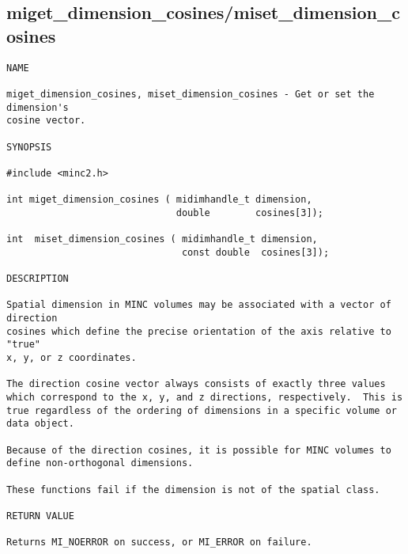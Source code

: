 \documentclass{article}
\begin{document}
\subsection{miget\_dimension\_cosines/miset\_dimension\_cosines}
\begin{verbatim}
NAME

miget_dimension_cosines, miset_dimension_cosines - Get or set the dimension's
cosine vector.

SYNOPSIS

#include <minc2.h>

int miget_dimension_cosines ( midimhandle_t dimension,
                              double        cosines[3]);

int  miset_dimension_cosines ( midimhandle_t dimension,
                               const double  cosines[3]);

DESCRIPTION

Spatial dimension in MINC volumes may be associated with a vector of direction
cosines which define the precise orientation of the axis relative to "true"
x, y, or z coordinates.

The direction cosine vector always consists of exactly three values
which correspond to the x, y, and z directions, respectively.  This is
true regardless of the ordering of dimensions in a specific volume or
data object.

Because of the direction cosines, it is possible for MINC volumes to
define non-orthogonal dimensions.

These functions fail if the dimension is not of the spatial class.

RETURN VALUE

Returns MI_NOERROR on success, or MI_ERROR on failure.
\end{verbatim}
\end{document}
